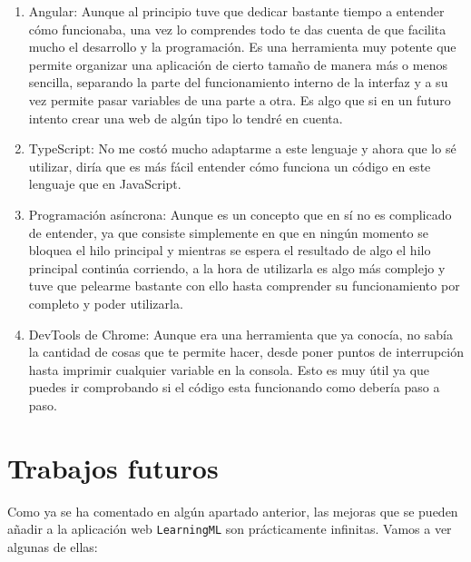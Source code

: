 \documentclass[a4paper, 12pt]{book}
\begin{document}
\begin{enumerate}
 \item Angular: Aunque al principio tuve que dedicar bastante tiempo a entender cómo funcionaba, una vez lo comprendes todo te das cuenta de que facilita mucho el desarrollo y la programación. Es una herramienta muy potente que permite organizar una aplicación de cierto tamaño de manera más o menos sencilla, separando la parte del funcionamiento interno de la interfaz y a su vez permite pasar variables de una parte a otra. Es algo que si en un futuro intento crear una web de algún tipo lo tendré en cuenta.

 \item TypeScript: No me costó mucho adaptarme a este lenguaje y ahora que lo sé utilizar, diría que es más fácil entender cómo funciona un código en este lenguaje que en JavaScript.

 \item Programación asíncrona: Aunque es un concepto que en sí no es complicado de entender, ya que consiste simplemente en que en ningún momento se bloquea el hilo principal y mientras se espera el resultado de algo el hilo principal continúa corriendo, a la hora de utilizarla es algo más complejo y tuve que pelearme bastante con ello hasta comprender su funcionamiento por completo y poder utilizarla.

 \item DevTools de Chrome: Aunque era una herramienta que ya conocía, no sabía la cantidad de cosas que te permite hacer, desde poner puntos de interrupción hasta imprimir cualquier variable en la consola. Esto es muy útil ya que puedes ir comprobando si el código esta funcionando como debería paso a paso.
\end{enumerate}



\section{Trabajos futuros}
\label{sec:trabajos_futuros}

Como ya se ha comentado en algún apartado anterior, las mejoras que se pueden añadir a la aplicación web \texttt{LearningML} son prácticamente infinitas. Vamos a ver algunas de ellas: 
\end{document}

